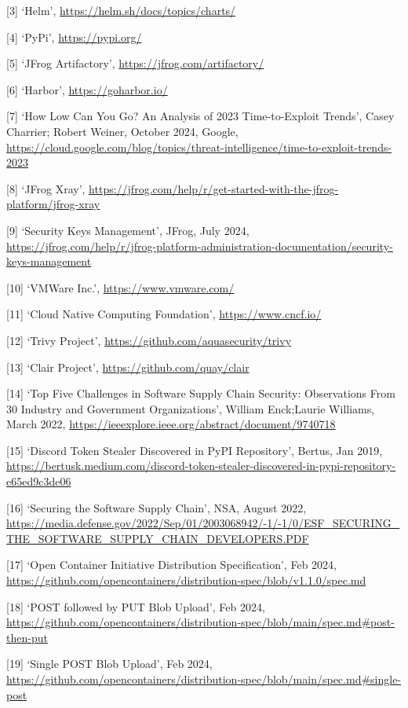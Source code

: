 \documentclass{article}
\begin{document}
  [3] `Helm', \url{https://helm.sh/docs/topics/charts/}

  [4] `PyPi', \url{https://pypi.org/}

  [5] `JFrog Artifactory', \url{https://jfrog.com/artifactory/}

  [6] `Harbor', \url{https://goharbor.io/}

  [7] `How Low Can You Go? An Analysis of 2023 Time-to-Exploit Trends', Casey Charrier; Robert Weiner, October 2024, Google, \url{https://cloud.google.com/blog/topics/threat-intelligence/time-to-exploit-trends-2023}

  [8] `JFrog Xray', \url{https://jfrog.com/help/r/get-started-with-the-jfrog-platform/jfrog-xray}

  [9] `Security Keys Management', JFrog, July 2024, \url{https://jfrog.com/help/r/jfrog-platform-administration-documentation/security-keys-management}

  [10] `VMWare Inc.', \url{https://www.vmware.com/}

  [11] `Cloud Native Computing Foundation', \url{https://www.cncf.io/}

  [12] `Trivy Project', \url{https://github.com/aquasecurity/trivy}

  [13] `Clair Project', \url{https://github.com/quay/clair}
  
  [14] `Top Five Challenges in Software Supply Chain Security: Observations From 30 Industry and Government Organizations', William Enck;Laurie Williams, March 2022, \url{https://ieeexplore.ieee.org/abstract/document/9740718}

  [15] `Discord Token Stealer Discovered in PyPI Repository', Bertus, Jan 2019, \url{https://bertusk.medium.com/discord-token-stealer-discovered-in-pypi-repository-e65ed9c3de06}

  [16] `Securing the Software Supply Chain', NSA, August 2022, \url{https://media.defense.gov/2022/Sep/01/2003068942/-1/-1/0/ESF_SECURING_THE_SOFTWARE_SUPPLY_CHAIN_DEVELOPERS.PDF}

  [17] `Open Container Initiative Distribution Specification', Feb 2024, \url{https://github.com/opencontainers/distribution-spec/blob/v1.1.0/spec.md}

  [18] `POST followed by PUT Blob Upload', Feb 2024, \url{https://github.com/opencontainers/distribution-spec/blob/main/spec.md#post-then-put}

  [19] `Single POST Blob Upload', Feb 2024, \url{https://github.com/opencontainers/distribution-spec/blob/main/spec.md#single-post}
\end{document}
